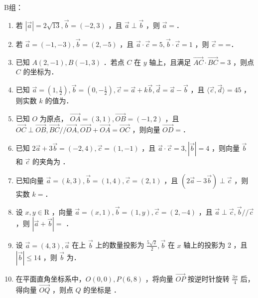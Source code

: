 B组：
\begin{enumerate}
    \item 若 $|\vec{a}|=2 \sqrt{13}, \vec{b}=(-2,3)$ ，且 $\vec{a} \perp \vec{b}$ ，则 $\vec{a}=$．

    \item 若 $\vec{a}=(-1,-3), \vec{b}=(2,-5)$ ，且 $\vec{a} \cdot \vec{c}=5, \vec{b} \cdot \vec{c}=1$ ，则 $\vec{c}=$=．

    \item 已知 $A(2,-1), B(-1,3)$ ．若点 $C$ 在 $y$ 轴上，且满足 $\overrightarrow{A C} \cdot \overrightarrow{B C}=3$ ，则点 $C$ 的坐标为．

    \item 已知 $\vec{a}=\left(1, \frac{1}{2}\right), \vec{b}=\left(0,-\frac{1}{2}\right), \vec{c}=\vec{a}+k \vec{b}, \vec{d}=\vec{a}-\vec{b}$ ，且 $\langle\vec{c}, \vec{d}\rangle=45$ ，则实数 $k$ 的值为．

    \item 已知 $O$ 为原点， $\overrightarrow{O A}=(3,1), \overrightarrow{O B}=(-1,2)$ ，且 $\overrightarrow{O C} \perp \overrightarrow{O B}, \overrightarrow{B C} / / \overrightarrow{O A}, \overrightarrow{O D}+\overrightarrow{O A}=\overrightarrow{O C}$ ，则向量 $\overrightarrow{O D}=$．

    \item 已知 $2 \vec{a}+3 \vec{b}=(-2,4), \vec{c}=(1,-1)$ ，且 $\vec{a} \cdot \vec{c}=3,|\vec{b}|=4$ ，则向量 $\vec{b}$ 和 $\vec{c}$ 的夹角为 ．

    \item 已知向量 $\vec{a}=(k, 3), \vec{b}=(1,4), \vec{c}=(2,1)$ ，且 $(2 \vec{a}-3 \vec{b}) \perp \vec{c}$ ，则实数 $k=$．

    \item 设 $x, y \in \mathrm{R}$ ，向量 $\vec{a}=(x, 1), \vec{b}=(1, y), \vec{c}=(2,-4)$ ，且 $\vec{a} \perp \vec{c}, \vec{b} / / \vec{c}$ ，则 $|\vec{a}+\vec{b}|=$ ．

    \item 设 $\vec{a}=(4,3), \vec{a}$ 在上 $\vec{b}$ 上的数量投影为 $\frac{5 \sqrt{2}}{2}, \vec{b}$ 在 $x$ 轴上的投影为 2 ，且 $|\vec{b}| \leq 14$ ，则 $\vec{b}$ 为．

    \item 在平面直角坐标系中，$O(0,0), P(6,8)$ ，将向量 $\overrightarrow{O P}$ 按逆时针旋转 $\frac{3 \pi}{4}$ 后，得向量 $\overrightarrow{O Q}$ ，则点 $Q$ 的坐标是 ．


\end{enumerate}

